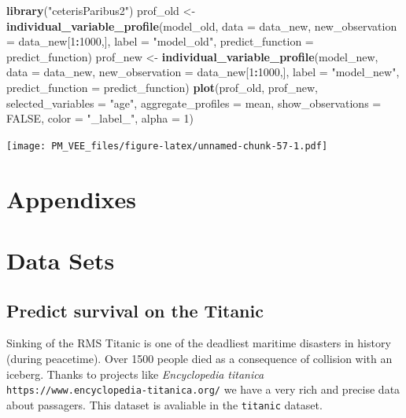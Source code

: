 \documentclass[]{krantz}
\newenvironment{Shaded}{\begin{snugshade}}{\end{snugshade}}
\newcommand{\DataTypeTok}[1]{\textcolor[rgb]{0.13,0.29,0.53}{#1}}
\newcommand{\DecValTok}[1]{\textcolor[rgb]{0.00,0.00,0.81}{#1}}
\newcommand{\KeywordTok}[1]{\textcolor[rgb]{0.13,0.29,0.53}{\textbf{#1}}}
\newcommand{\NormalTok}[1]{#1}
\newcommand{\OperatorTok}[1]{\textcolor[rgb]{0.81,0.36,0.00}{\textbf{#1}}}
\newcommand{\OtherTok}[1]{\textcolor[rgb]{0.56,0.35,0.01}{#1}}
\newcommand{\StringTok}[1]{\textcolor[rgb]{0.31,0.60,0.02}{#1}}
\theoremstyle{definition}
\theoremstyle{definition}
\theoremstyle{definition}
\theoremstyle{remark}
\begin{document}
\begin{Shaded}
\begin{Highlighting}[]
\KeywordTok{library}\NormalTok{(}\StringTok{"ceterisParibus2"}\NormalTok{)}
\NormalTok{prof_old <-}\StringTok{ }\KeywordTok{individual_variable_profile}\NormalTok{(model_old,}
                 \DataTypeTok{data =}\NormalTok{ data_new,}
                 \DataTypeTok{new_observation =}\NormalTok{ data_new[}\DecValTok{1}\OperatorTok{:}\DecValTok{1000}\NormalTok{,],}
                 \DataTypeTok{label =} \StringTok{"model_old"}\NormalTok{,}
                 \DataTypeTok{predict_function =}\NormalTok{ predict_function)}
\NormalTok{prof_new <-}\StringTok{ }\KeywordTok{individual_variable_profile}\NormalTok{(model_new,}
                 \DataTypeTok{data =}\NormalTok{ data_new,}
                 \DataTypeTok{new_observation =}\NormalTok{ data_new[}\DecValTok{1}\OperatorTok{:}\DecValTok{1000}\NormalTok{,],}
                 \DataTypeTok{label =} \StringTok{"model_new"}\NormalTok{,}
                 \DataTypeTok{predict_function =}\NormalTok{ predict_function)}
\KeywordTok{plot}\NormalTok{(prof_old, prof_new,}
     \DataTypeTok{selected_variables =} \StringTok{"age"}\NormalTok{, }\DataTypeTok{aggregate_profiles =}\NormalTok{ mean,}
     \DataTypeTok{show_observations =} \OtherTok{FALSE}\NormalTok{, }\DataTypeTok{color =} \StringTok{"_label_"}\NormalTok{, }\DataTypeTok{alpha =} \DecValTok{1}\NormalTok{)}
\end{Highlighting}
\end{Shaded}

\texttt{[image: PM\_VEE\_files/figure-latex/unnamed-chunk-57-1.pdf]}

\hypertarget{appendixes}{%
\section*{Appendixes}\label{appendixes}}

\hypertarget{DataSets}{%
\section{Data Sets}\label{DataSets}}

\hypertarget{TitanicDataset}{%
\subsection{Predict survival on the Titanic}\label{TitanicDataset}}

Sinking of the RMS Titanic is one of the deadliest maritime disasters in
history (during peacetime). Over 1500 people died as a consequence of
collision with an iceberg. Thanks to projects like \emph{Encyclopedia
titanica} \texttt{https://www.encyclopedia-titanica.org/} we have a very
rich and precise data about passagers. This dataset is avaliable in the
\texttt{titanic} dataset.
\end{document}
